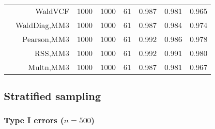 \documentclass[
]{article}
\begin{document}
\begin{table}[H]
{\begin{tabular}[t]{lrrrrrrr}
\hspace{1em} & WaldVCF & 1000 & 1000 & 61 & 0.987 & 0.981 & 0.965\\

\hspace{1em} & WaldDiag,MM3 & 1000 & 1000 & 61 & 0.987 & 0.984 & 0.974\\

\hspace{1em} & Pearson,MM3 & 1000 & 1000 & 61 & 0.992 & 0.986 & 0.978\\

\hspace{1em} & RSS,MM3 & 1000 & 1000 & 61 & 0.992 & 0.991 & 0.980\\

\hspace{1em} & Multn,MM3 & 1000 & 1000 & 61 & 0.987 & 0.981 & 0.967\\
\bottomrule
\end{tabular}}
\endgroup{}
\end{table}

\hypertarget{stratified-sampling}{%
\subsection{Stratified sampling}\label{stratified-sampling}}

\hypertarget{type-i-errors-n500-1}{%
\subsubsection{\texorpdfstring{Type I errors
(\(n=500\))}{Type I errors (n=500)}}\label{type-i-errors-n500-1}}
\end{document}
